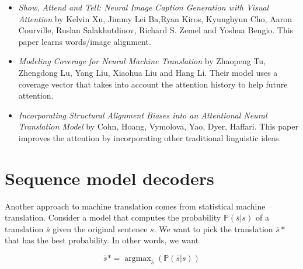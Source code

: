 \documentclass{tufte-handout}
\begin{document}
\begin{itemize}
\item \emph{Show, Attend and Tell: Neural Image Caption Generation with Visual Attention} by Kelvin Xu, Jimmy Lei Ba,Ryan Kiros, Kyunghyun Cho, Aaron Courville, Ruslan Salakhutdinov, Richard S. Zemel and Yoshua Bengio. This paper learns words/image alignment.
\item \emph{Modeling Coverage for Neural Machine Translation} by Zhaopeng Tu, Zhengdong Lu, Yang Liu, Xiaohua Liu and Hang Li. Their model uses a coverage vector that takes into account the attention history to help future attention.
\item \emph{Incorporating Structural Alignment Biases into an Attentional Neural Translation Model} by Cohn, Hoang, Vymolova, Yao, Dyer, Haffari. This paper improves the attention by incorporating other traditional linguistic ideas.
\end{itemize}

\section{Sequence model decoders}
Another approach to machine translation comes from statistical machine translation. Consider a model that computes the probability $ \mathbb{P}(\bar{s} | s) $ of a translation $ \bar{s} $ given the original sentence $ s $. We want to pick the translation $ \bar{s}* $ that has the best probability. In other words, we want 

$$ \bar{s}* = \operatorname{argmax}_{\bar{s}}(\mathbb{P}(\bar{s} | s )) $$
\end{document}
